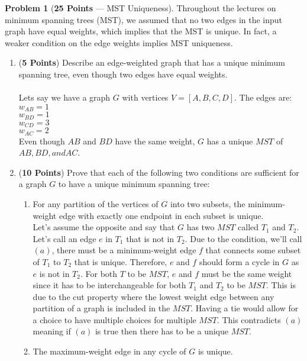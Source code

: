 \documentclass[11pt]{article}
\theoremstyle{definition}
\theoremstyle{theorem}
\newtheorem{prob}{Problem}
\begin{document}
\begin{prob}[\textbf{25 Points} --- MST Uniqueness]
    Throughout the lectures on minimum spanning trees (MST), we assumed that no two edges in the input graph have equal weights, which implies that the MST is unique. In fact, a weaker condition on the edge weights implies MST uniqueness.

    \begin{enumerate}
        \item (\textbf{5 Points}) Describe an edge-weighted graph that has a unique minimum spanning tree, even though two edges have equal weights. \\\\
        Lets say we have a graph $G$ with vertices $V=[A, B, C, D]$. The edges are: \\
        $w_{AB}=1$ \\
        $w_{BD}=1$ \\
        $w_{CD}=3$ \\
        $w_{AC}=2$ \\
        Even though $AB$ and $BD$ have the same weight, $G$ has a unique $MST$ of $AB, BD, and AC$.
        \item (\textbf{10 Points}) Prove that each of the following two conditions are sufficient for a graph $G$ to have a unique minimum spanning tree:
        \begin{enumerate}
            \item For any partition of the vertices of $G$ into two subsets, the minimum-weight edge with exactly one endpoint in each subset is unique. \\
            Let's assume the opposite and say that $G$ has two $MST$ called $T_{1}$ and $T_{2}$. Let's call an edge $e$ in $T_{1}$ that is not in $T_{2}$. Due to the condition, we'll call $(a)$, there must be a minimum-weight edge $f$ that connects some subset of $T_{1}$ to $T_{2}$ that is unique. Therefore, $e$ and $f$ should form a cycle in $G$ as $e$ is not in $T_{2}$. For both $T$ to be $MST$, $e$ and $f$ must be the same weight since it has to be interchangeable for both $T_{1}$ and $T_{2}$ to be $MST$. This is due to the cut property where the lowest weight edge between any partition of a graph is included in the $MST$. Having a tie would allow for a choice to have multiple choices for multiple $MST$. This contradicts $(a)$ meaning if $(a)$ is true then there has to be a unique $MST$.
            \item The maximum-weight edge in any cycle of $G$ is unique. \\

\end{enumerate}
\end{enumerate}
\end{prob}
\end{document}
